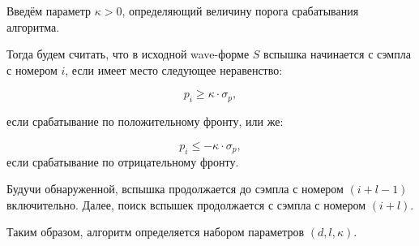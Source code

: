 \documentclass[12pt, a4paper, oneside, onecolumn]{book}
\begin{document}
Введём параметр $\kappa > 0$, определяющий величину порога срабатывания алгоритма.

Тогда будем считать, что в исходной wave-форме $S$ вспышка начинается с сэмпла с номером $i$, если имеет место следующее неравенство:

\begin{equation}
p_i \ge \kappa \cdot \sigma_p,
\end{equation}

\noindent если срабатывание по положительному фронту, или же:

\begin{equation}
p_i \le -\kappa \cdot \sigma_p,
\end{equation}
\noindent если срабатывание по отрицательному фронту.

Будучи обнаруженной, вспышка продолжается до сэмпла с номером $(i + l - 1)$ включительно. Далее, поиск вспышек продолжается с сэмпла с номером $(i + l)$.

Таким образом, алгоритм определяется набором параметров $(d, l, \kappa)$.


\printbibliography
\end{document}
